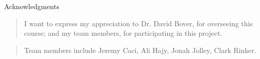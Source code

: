 \documentclass[dvips,11pt]{beamer}
\begin{document}
\begin{frame}{ Acknowledgments }

\begin{quote}I want to express my appreciation to Dr. David Bover, for overseeing this course; and my team members, for participating in this project. \end{quote}

\begin{quote}
Team members include Jeremy Caci, Ali Hajy, Jonah Jolley, Clark Rinker. \end{quote}
\end{frame}

\end{document}
